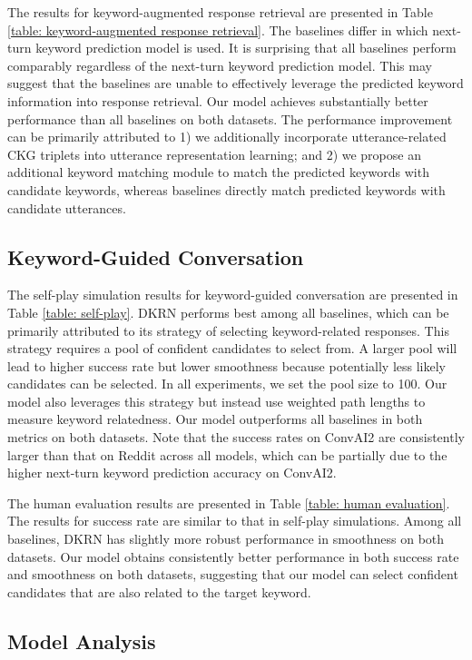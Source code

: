 \documentclass[letterpaper]{article} %
\begin{document}
The results for keyword-augmented response retrieval are presented in Table \ref{table: keyword-augmented response retrieval}. The baselines differ in which next-turn keyword prediction model is used. It is surprising that all baselines perform comparably regardless of the next-turn keyword prediction model. This may suggest that the baselines are unable to effectively leverage the predicted keyword information into response retrieval. Our model achieves substantially better performance than all baselines on both datasets. The performance improvement can be primarily attributed to 1) we additionally incorporate utterance-related CKG triplets into utterance representation learning; and 2) we propose an additional keyword matching module to match the predicted keywords with candidate keywords, whereas baselines directly match predicted keywords with candidate utterances.

\subsection{Keyword-Guided Conversation}
\label{sec: keyword-guided conversation}
The self-play simulation results for keyword-guided conversation are presented in Table \ref{table: self-play}. DKRN performs best among all baselines, which can be primarily attributed to its strategy of selecting keyword-related responses. This strategy requires a pool of confident candidates to select from. A larger pool will lead to higher success rate but lower smoothness because potentially less likely candidates can be selected. In all experiments, we set the pool size to 100. Our model also leverages this strategy but instead use weighted path lengths to measure keyword relatedness. Our model outperforms all baselines in both metrics on both datasets. Note that the success rates on ConvAI2 are consistently larger than that on Reddit across all models, which can be partially due to the higher next-turn keyword prediction accuracy on ConvAI2.

The human evaluation results are presented in Table \ref{table: human evaluation}. The results for success rate are similar to that in self-play simulations. Among all baselines, DKRN has slightly more robust performance in smoothness on both datasets. Our model obtains consistently better performance in both success rate and smoothness on both datasets, suggesting that our model can select confident candidates that are also related to the target keyword.

\subsection{Model Analysis}
\label{sec: model analysis}
\end{document}
